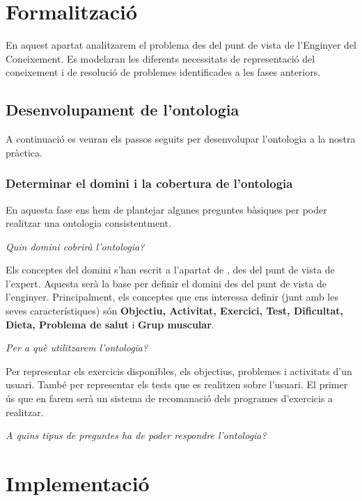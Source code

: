 \documentclass[a4paper, 12pt, UTF8]{article}
\begin{document}
\section{Formalització}

En aquest apartat analitzarem el problema des del punt de vista de l'Enginyer del Coneixement. Es modelaran les diferents necessitats de representació del coneixement i de resolució de problemes identificades a les fases anteriors.

\subsection{Desenvolupament de l'ontologia}

A continuació es veuran els passos seguits per desenvolupar l'ontologia a la nostra pràctica.

\subsubsection{Determinar el domini i la cobertura de l'ontologia}

En aquesta fase ens hem de plantejar algunes preguntes bàsiques per poder realitzar una ontologia consistentment.

\emph{Quin domini cobrirà l'ontologia?}

Els conceptes del domini s'han escrit a l'apartat de \textit{}, des del punt de vista de l'expert. Aquesta serà la base per definir el domini des del punt de vista de l'enginyer. Principalment, els conceptes que ens interessa definir (junt amb les seves característiques) són \textbf{Objectiu, Activitat, Exercici, Test, Dificultat, Dieta, Problema de salut} i \textbf{Grup muscular}.

\emph{Per a què utilitzarem l'ontologia?}

Per representar els exercicis disponibles, els objectius, problemes i activitats d'un usuari. També per representar  els tests que es realitzen sobre l'usuari. El primer ús que en farem serà un sistema de recomanació dels programes d'exercicis a realitzar.

\emph{A quins tipus de preguntes ha de poder respondre l'ontologia?}


\section{Implementació}
\end{document}
